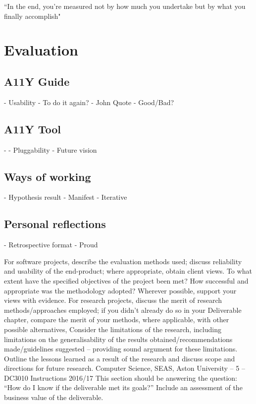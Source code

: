 \begin{savequote}[75mm]
``In the end, you're measured not by how much you undertake but by what you
finally accomplish"
\end{savequote}

\chapter{Evaluation}

\section{A11Y Guide}
- Usability
- To do it again?
- John Quote
- Good/Bad?

\section{A11Y Tool}
-
- Pluggability
- Future vision

\section{Ways of working}
- Hypothesis result
- Manifest
- Iterative

\section{Personal reflections}
- Retrospective format
- Proud


For software projects, describe the evaluation methods used; discuss reliability
and usability of the end-product; where appropriate, obtain client views. To
what extent have the specified objectives of the project been met? How
successful and appropriate was the methodology adopted? Wherever possible,
support your views with evidence.
For research projects, discuss the merit of research methods/approaches
employed; if you didn’t already do so in your Deliverable chapter, compare the
merit of your methods, where applicable, with other possible alternatives,
Consider the limitations of the research, including limitations on the
generalisability of the results obtained/recommendations made/guidelines
suggested – providing sound argument for these limitations. Outline the
lessons learned as a result of the research and discuss scope and directions for
future research.
Computer Science, SEAS, Aston University – 5 – DC3010 Instructions 2016/17
This section should be answering the question: “How do I know if the
deliverable met its goals?”
Include an assessment of the business value of the deliverable.

